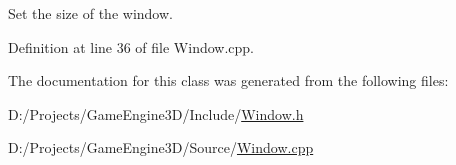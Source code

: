 Set the size of the window. 

Definition at line 36 of file Window.\+cpp.



The documentation for this class was generated from the following files\+:\begin{DoxyCompactItemize}
\item 
D\+:/\+Projects/\+Game\+Engine3\+D/\+Include/\mbox{\hyperlink{_window_8h}{Window.\+h}}\item 
D\+:/\+Projects/\+Game\+Engine3\+D/\+Source/\mbox{\hyperlink{_window_8cpp}{Window.\+cpp}}\end{DoxyCompactItemize}
